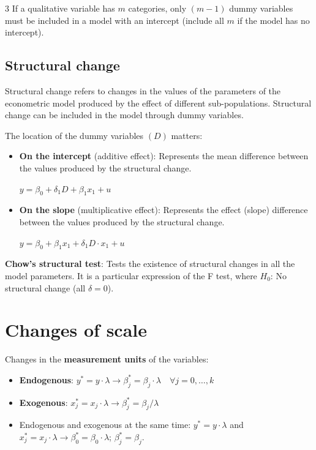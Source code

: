 \documentclass[10pt, a4paper, landscape]{article}
\begin{document}
\begin{multicols}{3}
If a qualitative variable has \( m \) categories, only \( (m - 1) \) dummy variables must be included in a model with an intercept (include all \( m \) if the model has no intercept).

\subsection*{Structural change}

Structural change refers to changes in the values of the parameters of the econometric model produced by the effect of different sub-populations. Structural change can be included in the model through dummy variables.

The location of the dummy variables \( (D) \) matters:

\begin{itemize}[leftmargin=*]
	\item \textbf{On the intercept} (additive effect): Represents the mean difference between the values produced by the structural change.
	\begin{center}
		\( y = \beta_{0} + \delta_{1} D + \beta_{1} x_{1} + u \)
	\end{center}
	\item \textbf{On the slope} (multiplicative effect): Represents the effect (slope) difference between the values produced by the structural change.
	\begin{center}
		\( y = \beta_{0} + \beta_{1} x_{1} + \delta_{1} D \cdot x_{1} + u \)
	\end{center}
\end{itemize}

\textbf{Chow's structural test}: Tests the existence of structural changes in all the model parameters. It is a particular expression of the F test, where \( H_{0} \): No structural change (all \( \delta = 0 \)).

\section*{Changes of scale}

Changes in the \textbf{measurement units} of the variables:

\begin{itemize}[leftmargin=*]
	\item \textbf{Endogenous}: \( y^{*} = y \cdot \lambda \rightarrow \beta_{j}^{*} = \beta_{j} \cdot \lambda \quad \forall j = 0, \ldots, k \)
	\item \textbf{Exogenous}: \( x_{j}^{*} = x_{j} \cdot \lambda \rightarrow \beta_{j}^{*} = \beta_{j} / \lambda \)
	\item Endogenous and exogenous at the same time: \( y^{*} = y \cdot \lambda \) and \( x_{j}^{*} = x_{j} \cdot \lambda \rightarrow \beta_{0}^{*} = \beta_{0} \cdot \lambda \); \( \beta_{j}^{*} = \beta_{j} \).
\end{itemize}


\end{multicols}
\end{document}

